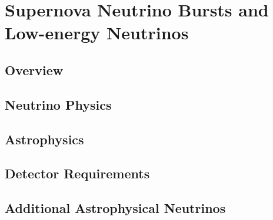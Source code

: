 \chapter{Supernova Neutrino Bursts and Low-energy Neutrinos}
\label{ch:physics-snblowe}

\section{Overview}
\label{sec:physics-snblowe-overview}

\section{Neutrino Physics}
\label{sec:physics-snblowe-neutrino-physics}

\section{Astrophysics}
\label{sec:physics-snblowe-astrophysics}

\section{Detector Requirements}
\label{sec:physics-snblowe-detector-requirements}

\section{Additional Astrophysical Neutrinos}
\label{sec:physics-snblowe-other}

